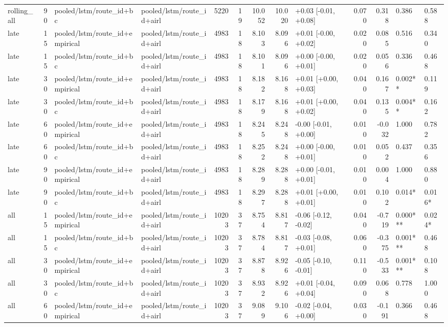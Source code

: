 \begin{tabular}{lrllrrrrlrrll}
rolling_all & 90 & pooled/lstm/route_id+bc & pooled/lstm/route_id+airl & 5220 & 19 & 10.052 & 10.020 & +0.03 [-0.01, +0.08] & 0.070 & 0.318 & 0.386 & 0.588 \\
late & 15 & pooled/lstm/route_id+empirical & pooled/lstm/route_id+airl & 4983 & 18 & 8.103 & 8.096 & +0.01 [-0.00, +0.02] & 0.020 & 0.085 & 0.516 & 0.340 \\
late & 15 & pooled/lstm/route_id+bc & pooled/lstm/route_id+airl & 4983 & 18 & 8.101 & 8.096 & +0.00 [-0.00, +0.01] & 0.020 & 0.056 & 0.336 & 0.468 \\
late & 30 & pooled/lstm/route_id+empirical & pooled/lstm/route_id+airl & 4983 & 18 & 8.182 & 8.168 & +0.01 [+0.00, +0.03] & 0.040 & 0.167 & 0.002** & 0.119 \\
late & 30 & pooled/lstm/route_id+bc & pooled/lstm/route_id+airl & 4983 & 18 & 8.179 & 8.168 & +0.01 [+0.00, +0.02] & 0.040 & 0.135 & 0.004** & 0.162 \\
late & 60 & pooled/lstm/route_id+empirical & pooled/lstm/route_id+airl & 4983 & 18 & 8.245 & 8.248 & -0.00 [-0.01, +0.00] & 0.010 & -0.032 & 1.000 & 0.782 \\
late & 60 & pooled/lstm/route_id+bc & pooled/lstm/route_id+airl & 4983 & 18 & 8.252 & 8.248 & +0.00 [-0.00, +0.01] & 0.010 & 0.052 & 0.437 & 0.356 \\
late & 90 & pooled/lstm/route_id+empirical & pooled/lstm/route_id+airl & 4983 & 18 & 8.289 & 8.288 & +0.00 [-0.01, +0.01] & 0.010 & 0.004 & 1.000 & 0.880 \\
late & 90 & pooled/lstm/route_id+bc & pooled/lstm/route_id+airl & 4983 & 18 & 8.297 & 8.288 & +0.01 [+0.00, +0.01] & 0.010 & 0.102 & 0.014* & 0.016* \\
all & 15 & pooled/lstm/route_id+empirical & pooled/lstm/route_id+airl & 10203 & 37 & 8.754 & 8.817 & -0.06 [-0.12, -0.02] & 0.040 & -0.719 & 0.000*** & 0.024* \\
all & 15 & pooled/lstm/route_id+bc & pooled/lstm/route_id+airl & 10203 & 37 & 8.784 & 8.817 & -0.03 [-0.08, +0.01] & 0.060 & -0.375 & 0.001*** & 0.468 \\
all & 30 & pooled/lstm/route_id+empirical & pooled/lstm/route_id+airl & 10203 & 37 & 8.878 & 8.926 & -0.05 [-0.10, -0.01] & 0.110 & -0.533 & 0.001*** & 0.108 \\
all & 30 & pooled/lstm/route_id+bc & pooled/lstm/route_id+airl & 10203 & 37 & 8.932 & 8.926 & +0.01 [-0.04, +0.04] & 0.090 & 0.068 & 0.778 & 1.000 \\
all & 60 & pooled/lstm/route_id+empirical & pooled/lstm/route_id+airl & 10203 & 37 & 9.089 & 9.106 & -0.02 [-0.04, +0.00] & 0.030 & -0.191 & 0.366 & 0.468 \\

\end{tabular}
